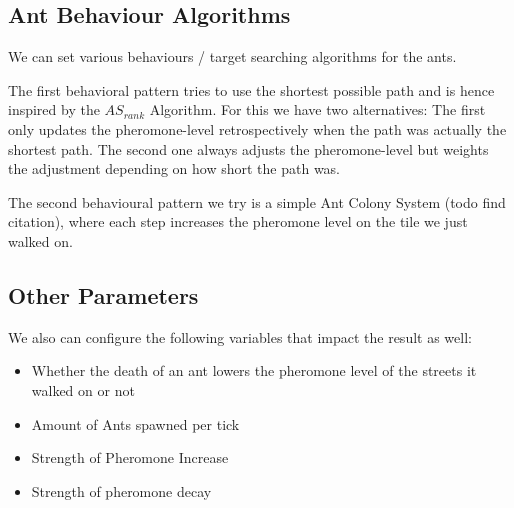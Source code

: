\subsection{Ant Behaviour Algorithms}
We can set various behaviours / target searching algorithms for the ants.

The first behavioral pattern tries to use the shortest possible path and is hence inspired by the $AS_{rank}$ Algorithm\cite{zecchin2007ant}.
For this we have two alternatives: The first only updates the pheromone-level retrospectively when the path was actually the shortest path. The second one always adjusts the pheromone-level but weights the adjustment depending on how short the path was.

The second behavioural pattern we try is a simple Ant Colony System (todo find citation), where each step increases the pheromone level on the tile we just walked on.

\subsection{Other Parameters}
\label{sec:otherparamas}
We also can configure the following variables that impact the result as well:
\begin{itemize}
\item  Whether the death of an ant lowers the pheromone level of the streets it walked on or not
\item Amount of Ants spawned per tick
\item Strength of Pheromone Increase
\item Strength of pheromone decay
\end{itemize}